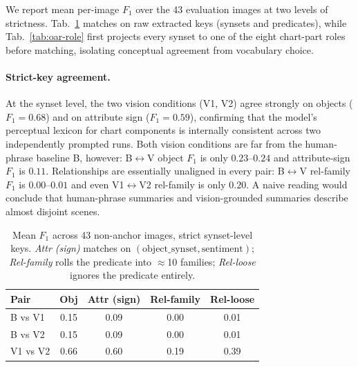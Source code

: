 We report mean per-image $F_1$ over the 43 evaluation images at
two levels of strictness. Tab.~\ref{tab:oar-strict} matches on
raw extracted keys (synsets and predicates), while
Tab.~\ref{tab:oar-role} first projects every synset to one of the
eight chart-part roles before matching, isolating conceptual
agreement from vocabulary choice.

\paragraph{Strict-key agreement.}
At the synset level, the two vision conditions (V1, V2) agree
strongly on objects ($F_1 = 0.68$) and on attribute sign
($F_1 = 0.59$), confirming that the model's perceptual lexicon for
chart components is internally consistent across two independently
prompted runs. Both vision conditions are far from the
human-phrase baseline B, however: B$\leftrightarrow$V object
$F_1$ is only $0.23$--$0.24$ and attribute-sign $F_1$ is
$0.11$. Relationships are essentially unaligned in every
pair: B$\leftrightarrow$V rel-family $F_1$ is $0.00$--$0.01$ and even
V1$\leftrightarrow$V2 rel-family is only $0.20$. A naive reading
would conclude that human-phrase summaries and vision-grounded
summaries describe almost disjoint scenes.

\begin{table}[h]
\centering
\caption{Mean $F_1$ across 43 non-anchor images, strict
synset-level keys. \emph{Attr (sign)} matches on
$(\text{object\_synset}, \text{sentiment})$;
\emph{Rel-family} rolls the predicate into $\approx$10
families; \emph{Rel-loose} ignores the predicate entirely.}
\label{tab:oar-strict}
\footnotesize
\setlength{\tabcolsep}{4pt}
\begin{tabular*}{\linewidth}{@{\extracolsep{\fill}}lcccc@{}}
\toprule
Pair      & Obj  & Attr (sign) & Rel-family & Rel-loose \\
\midrule
B vs V1   & 0.15 & 0.09        & 0.00       & 0.01 \\
B vs V2   & 0.15 & 0.09        & 0.00       & 0.01 \\
V1 vs V2  & 0.66 & 0.60        & 0.19       & 0.39 \\
\bottomrule
\end{tabular*}
\end{table}


